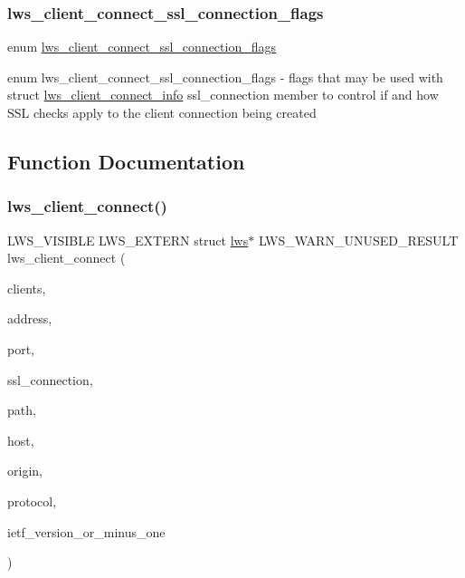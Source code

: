 \subsubsection{\texorpdfstring{lws\+\_\+client\+\_\+connect\+\_\+ssl\+\_\+connection\+\_\+flags}{lws\_client\_connect\_ssl\_connection\_flags}\hspace{0.1cm}{\footnotesize\ttfamily [8/8]}}
{\footnotesize\ttfamily enum \hyperlink{group__client_ga96f3dbad54b2853969cfa933d66871ce}{lws\+\_\+client\+\_\+connect\+\_\+ssl\+\_\+connection\+\_\+flags}}

enum lws\+\_\+client\+\_\+connect\+\_\+ssl\+\_\+connection\+\_\+flags -\/ flags that may be used with struct \hyperlink{structlws__client__connect__info}{lws\+\_\+client\+\_\+connect\+\_\+info} ssl\+\_\+connection member to control if and how S\+SL checks apply to the client connection being created 

\subsection{Function Documentation}
\mbox{\label{group__client_ga4af0a20108a95e8b6d94dd4d80055ff3}} 
\subsubsection{\texorpdfstring{lws\+\_\+client\+\_\+connect()}{lws\_client\_connect()}}
{\footnotesize\ttfamily L\+W\+S\+\_\+\+V\+I\+S\+I\+B\+LE L\+W\+S\+\_\+\+E\+X\+T\+E\+RN struct \hyperlink{structlws}{lws}$\ast$ L\+W\+S\+\_\+\+W\+A\+R\+N\+\_\+\+U\+N\+U\+S\+E\+D\+\_\+\+R\+E\+S\+U\+LT lws\+\_\+client\+\_\+connect (\begin{DoxyParamCaption}\item[{struct \hyperlink{structlws__context}{lws\+\_\+context} $\ast$}]{clients,  }\item[{const char $\ast$}]{address,  }\item[{int}]{port,  }\item[{int}]{ssl\+\_\+connection,  }\item[{const char $\ast$}]{path,  }\item[{const char $\ast$}]{host,  }\item[{const char $\ast$}]{origin,  }\item[{const char $\ast$}]{protocol,  }\item[{int}]{ietf\+\_\+version\+\_\+or\+\_\+minus\+\_\+one }\end{DoxyParamCaption})}

